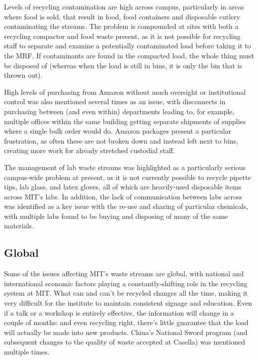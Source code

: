 \documentclass[nofonts,nols,justified,nobib]{tufte-book}
\begin{document}
Levels of recycling contamination are high across campus, particularly in areas where food is sold, that result in food, food containers and disposable cutlery contaminating the streams. The problem is compounded at sites with both a recycling compactor and food waste present, as it is not possible for recycling staff to separate and examine a potentially contaminated load before taking it to the MRF. If contaminants are found in the compacted load, the whole thing must be disposed of (whereas when the load is still in bins, it is only the bin that is thrown out).

High levels of purchasing from Amazon without much oversight or institutional control was also mentioned several times as an issue, with disconnects in purchasing between (and even within) departments leading to, for example, multiple offices within the same building getting separate shipments of supplies where a single bulk order would do. Amazon packages present a particular frustration, as often these are not broken down and instead left next to bins, creating more work for already stretched custodial staff.

The management of lab waste streams was highlighted as a particularly serious campus-wide problem at present, as it is not currently possible to recycle pipette tips, lab glass, and latex gloves, all of which are heavily-used disposable items across MIT's labs. In addition, the lack of communication between labs across was identified as a key issue with the re-use and sharing of particular chemicals, with multiple labs found to be buying and disposing of many of the same materials. 


\subsection*{Global}

Some of the issues affecting MIT's waste streams are global, with national and international economic factors playing a constantly-shifting role in the recycling system at MIT. What can and can't be recycled changes all the time, making it very difficult for the institute to maintain consistent signage and education. Even if a talk or a workshop is entirely effective, the information will change in a couple of months: and even recycling right, there's little guarantee that the load will actually be made into new products. China's National Sword program (and subsequent changes to the quality of waste accepted at Casella) was mentioned multiple times.
\end{document}
